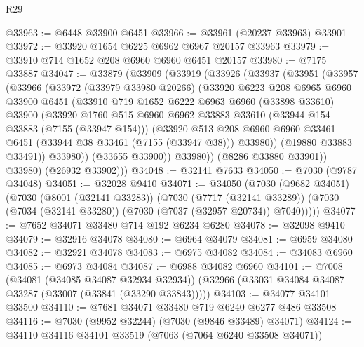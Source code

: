 \begin{lexlean}{R29}
\begin{coremodule}
@33963 := @6448 @33900 @6451
@33966 := @33961 (@20237 @33963) @33901
@33972 := @33920 @1654 @6225 @6962 @6967 @20157 @33963
@33979 := @33910 @714 @1652 @208 @6960 @6960 @6451 @20157
@33980 := @7175 @33887
@34047 := @33879
    (@33909
      (@33919
        (@33926
          (@33937
            (@33951
              (@33957
                (@33966
                  (@33972
                    (@33979 @33980 @20266)
                    (@33920
                      @6223
                      @208
                      @6965
                      @6960
                      @33900
                      @6451
                      (@33910
                        @719
                        @1652
                        @6222
                        @6963
                        @6960
                        (@33898 @33610)
                        @33900
                        (@33920
                          @1760
                          @515
                          @6960
                          @6962
                          @33883
                          @33610
                          (@33944 @154 @33883 (@7155 (@33947 @154)))
                          (@33920
                            @513
                            @208
                            @6960
                            @6960
                            @33461
                            @6451
                            (@33944 @38 @33461 (@7155 (@33947 @38)))
                            @33980))
                        (@19880 @33883 @33491))
                      @33980))
                  (@33655 @33900))
                @33980))
            (@8286 @33880 @33901))
          @33980)
        (@26932 @33902)))
@34048 := @32141 @7633
@34050 := @7030 (@9787 @34048)
@34051 := @32028 @9410
@34071 := @34050
    (@7030
      (@9682 @34051)
      (@7030
        (@8001 (@32141 @33283))
        (@7030
          (@7717 (@32141 @33289))
          (@7030 (@7034 (@32141 @33280)) (@7030 (@7037 (@32957 @20734)) @7040)))))
@34077 := @7652 @34071 @33480 @714 @192 @6234 @6280
@34078 := @32098 @9410
@34079 := @32916 @34078
@34080 := @6964 @34079
@34081 := @6959 @34080
@34082 := @32921 @34078
@34083 := @6975 @34082
@34084 := @34083 @6960
@34085 := @6973 @34084
@34087 := @6988 @34082 @6960
@34101 := @7008
    (@34081 (@34085 @34087 @32934 @32934))
    (@32966 (@33031 @34084 @34087 @33287 (@33007 (@33841 (@33290 @33843)))))
@34103 := @34077 @34101 @33500
@34110 := @7681 @34071 @33480 @719 @6240 @6277 @486 @33508
@34116 := @7030 (@9952 @32244) (@7030 (@9846 @33489) @34071)
@34124 := @34110 @34116 @34101 @33519 (@7063 (@7064 @6240 @33508 @34071))

\end{coremodule}
\end{lexlean}
